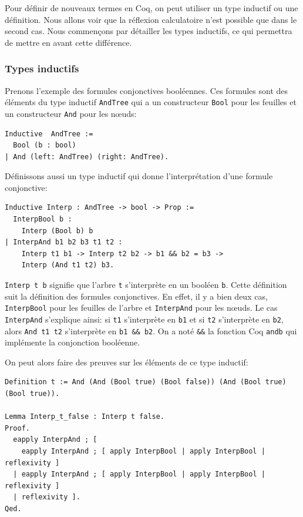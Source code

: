 \documentclass[11pt]{article}
\begin{document}
Pour définir de nouveaux termes en Coq, on peut utiliser un type inductif ou une définition. Nous allons voir que la réflexion calculatoire n'est possible que dans le second cas. Nous commençons par détailler les types inductifs, ce qui permettra de mettre en avant cette différence.

\subsubsection{Types inductifs}

Prenons l'exemple des formules conjonctives booléennes. Ces formules sont des éléments du type inductif \texttt{AndTree} qui a un constructeur \texttt{Bool} pour les feuilles et un constructeur \texttt{And} pour les nœuds: 

\begin{lstlisting}[frame=single]
Inductive  AndTree := 
  Bool (b : bool) 
| And (left: AndTree) (right: AndTree).
\end{lstlisting}

Définissons aussi un type inductif qui donne l'interprétation d'une formule conjonctive: 

\begin{lstlisting}[frame=single]
Inductive Interp : AndTree -> bool -> Prop :=
  InterpBool b :
    Interp (Bool b) b
| InterpAnd b1 b2 b3 t1 t2 :
    Interp t1 b1 -> Interp t2 b2 -> b1 && b2 = b3 ->
    Interp (And t1 t2) b3.
\end{lstlisting}

\texttt{Interp t b} signifie que l'arbre \texttt{t} s'interprète en un booléen \texttt{b}. Cette définition suit la définition des formules conjonctives. En effet, il y a bien deux cas, \texttt{InterpBool} pour les feuilles de l'arbre et \texttt{InterpAnd} pour les nœuds. Le cas \texttt{InterpAnd} s'explique ainsi: si \texttt{t1} s'interprète en \texttt{b1} et si \texttt{t2} s'interprète en \texttt{b2}, alors \texttt{And t1 t2} s'interprète en \texttt{b1 \&\& b2}. On a noté \texttt{\&\&} la fonction Coq \texttt{andb} qui implémente la conjonction booléenne.

On peut alors faire des preuves sur les éléments de ce type inductif: 
\begin{lstlisting}[frame=single]
Definition t := And (And (Bool true) (Bool false)) (And (Bool true) (Bool true)).

Lemma Interp_t_false : Interp t false.
Proof.
  eapply InterpAnd ; [
    eapply InterpAnd ; [ apply InterpBool | apply InterpBool | reflexivity ]
  | eapply InterpAnd ; [ apply InterpBool | apply InterpBool | reflexivity ]
  | reflexivity ].
Qed.
\end{lstlisting}
\end{document}
